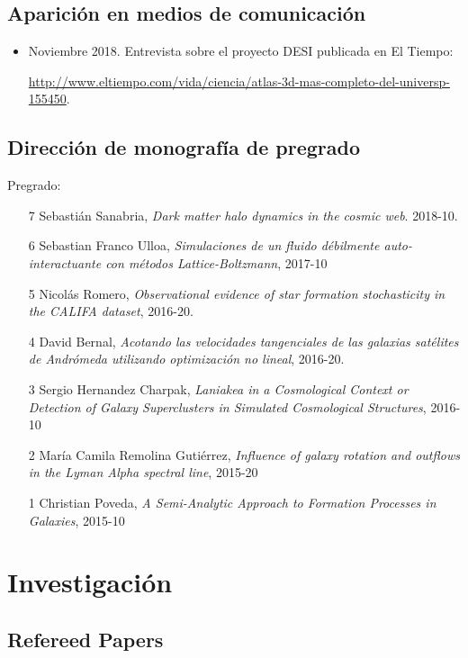 \documentclass{article}
\begin{document}
\subsection{Aparici\'on en medios de comunicaci\'on}

\begin{itemize}
\item Noviembre 2018. Entrevista sobre el proyecto DESI publicada en El Tiempo:

 \url{http://www.eltiempo.com/vida/ciencia/atlas-3d-mas-completo-del-universp-155450}.
\end{itemize}

\subsection{Direcci\'on de monograf\'ia de pregrado}

Pregrado:
\begin{itemize}
\item [7] Sebasti\'an Sanabria, \emph{Dark matter halo dynamics in the
  cosmic web}. 2018-10.
\item [6] Sebastian Franco Ulloa, \emph{Simulaciones de un fluido
  débilmente auto-interactuante con métodos Lattice-Boltzmann},
  2017-10
\item [5] Nicol\'as Romero, \emph{Observational evidence of star formation
  stochasticity in the CALIFA dataset}, 2016-20.
\item [4] David Bernal, \emph{Acotando las velocidades tangenciales de las
  galaxias satélites de Andrómeda utilizando optimización no lineal}, 2016-20.
\item [3] Sergio Hernandez Charpak, \emph{Laniakea in a Cosmological
  Context or Detection of Galaxy Superclusters in Simulated
  Cosmological Structures}, 2016-10
\item [2] Mar\'ia Camila Remolina Guti\'errez, \emph{Influence of galaxy
  rotation and outflows in the Lyman Alpha spectral line}, 2015-20
\item [1] Christian Poveda, \emph{A Semi-Analytic Approach to Formation
  Processes in Galaxies}, 2015-10
\end{itemize}


\newpage
\section{Investigaci\'on}

\subsection{Refereed Papers}
\end{document}
